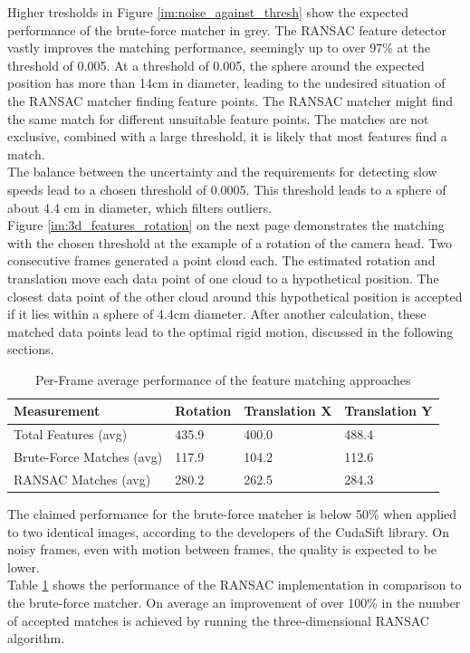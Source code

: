 Higher tresholds in Figure \ref{im:noise_against_thresh} show the expected performance of the brute-force matcher in grey. The RANSAC feature detector vastly improves the matching performance, seemingly up to over 97\% at the threshold of 0.005. At a threshold of 0.005, the sphere around the expected position has more than 14cm in diameter, leading to the undesired situation of the RANSAC matcher finding feature points. The RANSAC matcher might find the same match for different unsuitable feature points. The matches are not exclusive, combined with a large threshold, it is likely that most features find a match.\\
The balance between the uncertainty and the requirements for detecting slow speeds lead to a chosen threshold of 0.0005. This threshold leads to a sphere of about 4.4 cm in diameter, which filters outliers.\\ 
Figure \ref{im:3d_features_rotation} on the next page demonstrates the matching with the chosen threshold at the example of a rotation of the camera head. Two consecutive frames generated a point cloud each. The estimated rotation and translation move each data point of one cloud to a hypothetical position. The closest data point of the other cloud around this hypothetical position is accepted if it lies within a sphere of 4.4cm diameter. 
After another calculation, these matched data points lead to the optimal rigid motion, discussed in the following sections.\\

\begin{table}[ht] \centering
	\begin{tabular}{|p{5cm}|p{3cm}|p{3cm}|p{3cm}|} \hline
		\rowcolor{gray} Measurement & Rotation & Translation X & Translation Y \\
		\hline
		Total Features (avg) & 435.9 & 400.0 & 488.4\\
		\hline
		Brute-Force Matches (avg) & 117.9 & 104.2 & 112.6  \\
		\hline
		RANSAC Matches (avg) & 280.2 & 262.5 & 284.3  \\
		\hline
	\end{tabular}
	\caption{Per-Frame average performance of the feature matching approaches}
	\label{tab:ransac_performance}
 \end{table}
 The claimed performance for the brute-force matcher is below 50\% when applied to two identical images, according to the developers of the CudaSift library.\cite{cudaSiftRepo} On noisy frames, even with motion between frames, the quality is expected to be lower.\\
 Table \ref{tab:ransac_performance} shows the performance of the RANSAC implementation in comparison to the brute-force matcher. On average an improvement of over 100\% in the number of accepted matches is achieved by running the three-dimensional RANSAC algorithm.


